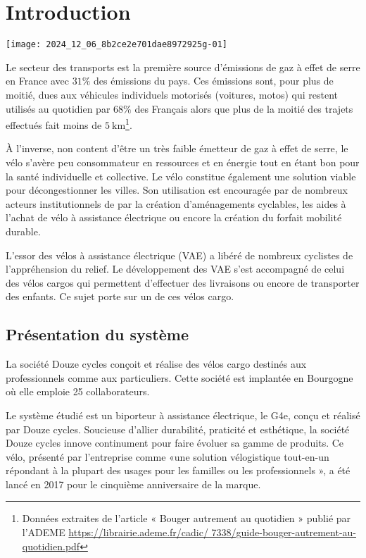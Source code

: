 \section{Introduction}

\begin{center}
\texttt{[image: 2024\_12\_06\_8b2ce2e701dae8972925g-01]}
\end{center}


Le secteur des transports est la première source d'émissions de gaz à effet de serre en France avec \(31 \%\) des émissions du pays. Ces émissions sont, pour plus de moitié, dues aux véhicules individuels motorisés (voitures, motos) qui restent utilisés au quotidien par \(68 \%\) des Français alors que plus de la moitié des trajets effectués fait moins de \(5 \mathrm{~km}\)\footnote{Données extraites de l’article « Bouger autrement au quotidien » publié par l’ADEME  \url{https://librairie.ademe.fr/cadic/
7338/guide-bouger-autrement-au-quotidien.pdf}}.

À l'inverse, non content d'être un très faible émetteur de gaz à effet de serre, le vélo s'avère peu consommateur en ressources et en énergie tout en étant bon pour la santé individuelle et collective. Le vélo constitue également une solution viable pour décongestionner les villes. Son utilisation est encouragée par de nombreux acteurs institutionnels de par la création d'aménagements cyclables, les aides à l'achat de vélo à assistance électrique ou encore la création du forfait mobilité durable.

L'essor des vélos à assistance électrique (VAE) a libéré de nombreux cyclistes de l'appréhension du relief. Le développement des VAE s'est accompagné de celui des vélos cargos qui permettent d'effectuer des livraisons ou encore de transporter des enfants. Ce sujet porte sur un de ces vélos cargo.

\subsection{Présentation du système}

La société Douze cycles conçoit et réalise des vélos cargo destinés aux professionnels comme aux particuliers. Cette société est implantée en Bourgogne où elle emploie 25 collaborateurs.

Le système étudié est un biporteur à assistance électrique, le G4e, conçu et réalisé par Douze cycles. Soucieuse d'allier durabilité, praticité et esthétique, la société Douze cycles innove continument pour faire évoluer sa gamme de produits. Ce vélo, présenté par l'entreprise comme «une solution vélogistique tout-en-un répondant à la plupart des usages pour les familles ou les professionnels », a été lancé en 2017 pour le cinquième anniversaire de la marque.

